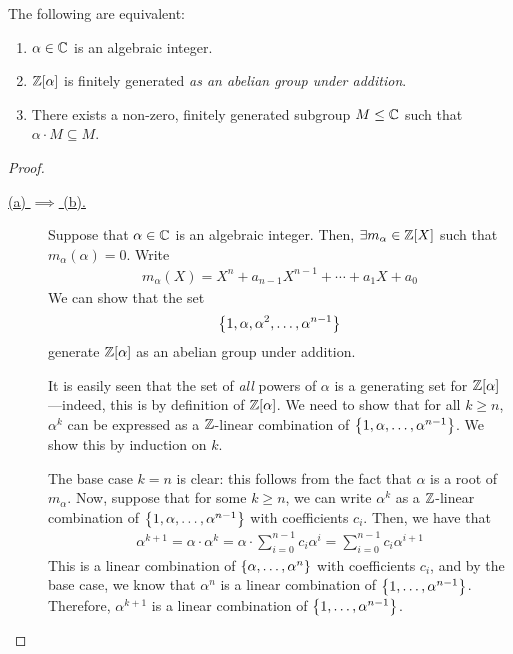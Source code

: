 \begin{boxproposition}
    The following are equivalent:
    \begin{enumerate}[label = \normalfont (\alph*)]
        \item $\alpha \in \mathbb{C}$ is an algebraic integer.
        \item $\mathbb{Z}\!\left[ \alpha \right]$ is finitely generated \emph{as an abelian group under addition}.
        \item There exists a non-zero, finitely generated subgroup $M \leq \mathbb{C}$ such that $\alpha \cdot M \subseteq M$.
    \end{enumerate}
\end{boxproposition}
\begin{proof}\hfill
    \begin{description}
        \item[\underline{(a) $\implies$ (b).}] Suppose that $\alpha \in \mathbb{C}$ is an algebraic integer. Then, $\exists m_{\alpha} \in \mathbb{Z}[X]$ such that $m_{\alpha}(\alpha) = 0$. Write
        \begin{align*}
            m_{\alpha}(X) = X^n + a_{n-1}X^{n-1} + \cdots + a_1X + a_0
        \end{align*}
        We can show that the set
        \begin{align*}
            \left\{ 1, \alpha, \alpha^2, \ldots, \alpha^{n-1} \right\}
        \end{align*}
        generate $\mathbb{Z}\!\left[ \alpha \right]$ as an abelian group under addition.

        It is easily seen that the set of \textit{all} powers of $\alpha$ is a generating set for $\mathbb{Z}\!\left[ \alpha \right]$---indeed, this is by definition of $\mathbb{Z}\!\left[ \alpha \right]$. We need to show that for all $k \geq n$, $\alpha^{k}$ can be expressed as a $\mathbb{Z}$-linear combination of $\left\{ 1, \alpha, \ldots, \alpha^{n-1} \right\}$. We show this by induction on $k$.

        The base case $k = n$ is clear: this follows from the fact that $\alpha$ is a root of $m_{\alpha}$. Now, suppose that for some $k \geq n$, we can write $\alpha^{k}$ as a $\mathbb{Z}$-linear combination of $\left\{ 1, \alpha, \ldots, \alpha^{n-1} \right\}$ with coefficients $c_i$. Then, we have that
        \begin{align*}
            \alpha^{k+1} = \alpha \cdot \alpha^{k} = \alpha \cdot \sum_{i=0}^{n-1} c_i \alpha^{i} = \sum_{i=0}^{n-1} c_i \alpha^{i+1}
        \end{align*}
        This is a linear combination of $\left\{ \alpha, \ldots, \alpha^{n} \right\}$ with coefficients $c_i$, and by the base case, we know that $\alpha^n$ is a linear combination of $\left\{ 1, \ldots, \alpha^{n-1} \right\}$. Therefore, $\alpha^{k+1}$ is a linear combination of $\left\{ 1, \ldots, \alpha^{n-1} \right\}$.


\end{description}
\end{proof}
